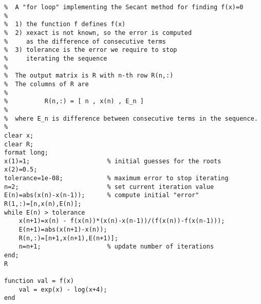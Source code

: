 \documentclass[11pt]{article}
\begin{document}
\newpage
\begin{Verbatim}
%  A "for loop" implementing the Secant method for finding f(x)=0
%
%  1) the function f defines f(x)
%  2) xexact is not known, so the error is computed
%     as the difference of consecutive terms
%  3) tolerance is the error we require to stop
%     iterating the sequence
%
%  The output matrix is R with n-th row R(n,:)
%  The columns of R are
%
%          R(n,:) = [ n , x(n) , E_n ]
%
%  where E_n is difference between consecutive terms in the sequence.
%
clear x;
clear R;
format long;
x(1)=1;                     % initial guesses for the roots
x(2)=0.5;
tolerance=1e-08;            % maximum error to stop iterating
n=2;                        % set current iteration value
E(n)=abs(x(n)-x(n-1));      % compute initial "error"
R(1,:)=[n,x(n),E(n)];
while E(n) > tolerance
    x(n+1)=x(n) - f(x(n))*(x(n)-x(n-1))/(f(x(n))-f(x(n-1)));
    E(n+1)=abs(x(n+1)-x(n));
    R(n,:)=[n+1,x(n+1),E(n+1)];
    n=n+1;                  % update number of iterations
end;
R

function val = f(x)
    val = exp(x) - log(x+4);
end
\end{Verbatim}

\end{document}
